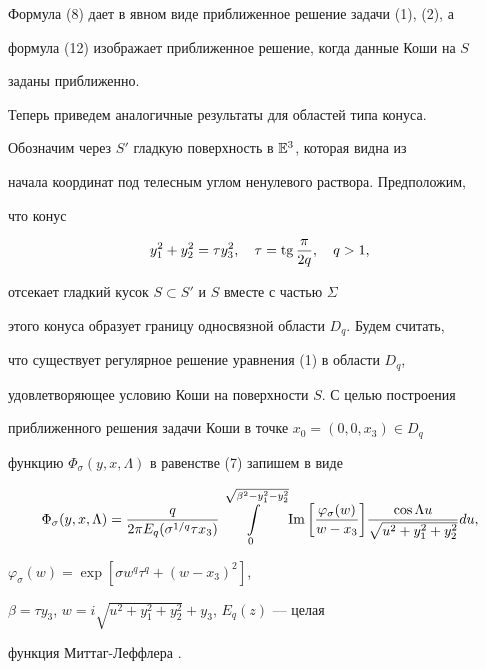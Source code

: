  


Формула (8) дает в явном виде приближенное решение задачи (1), (2), а 


формула (12) изображает приближенное решение, когда данные Коши на $S$ 


заданы приближенно. 


 


Теперь приведем аналогичные результаты для областей типа конуса. 


Обозначим через $S'$ гладкую поверхность в $\Bbb E^3$, которая видна из 


начала координат под телесным углом ненулевого раствора. Предположим, 


что конус 


$$ 


y^2_1+y^2_2=\tau y^2_3,\quad 


\tau=\tg\frac{\pi}{2q},\quad q>1, 


$$ 


отсекает гладкий кусок $S\subset S'$ и $S$ вместе с частью $\Sigma$ 


этого конуса образует границу односвязной области $D_q$. Будем считать, 


что существует регулярное решение уравнения (1) в области $D_q$, 


удовлетворяющее условию Коши на поверхности $S$. С целью построения 


приближенного решения задачи Коши в точке $x_0=(0,0,x_3)\in D_q$ 


функцию $\Phi_\sigma(y,x,\Lambda)$ в равенстве (7) запишем в виде 


$$ 


\Phi_\sigma(y,x,\Lambda)= 


\frac{q}{2\pi E_q(\sigma^{1/q}\tau x_3)} 


\int\limits_0^{\sqrt{\beta^2-y^2_1-y^2_2}}\text{Im\,} 


\bigg[\frac{\varphi_\sigma(w)}{w-x_3}\bigg] 


\frac{\cos\Lambda u}{\sqrt{u^2+y^2_1+y^2_2}}du, 


$$ 


$\varphi_\sigma(w)=\exp[\sigma w^q\tau^q+(w-x_3)^2]$, 


$\beta=\tau y_3$, $w=i\sqrt{u^2+y^2_1+y^2_2}+y_3$, $E_q(z)$ --- целая 


функция Миттаг-Леффлера \cite{11}. 


 


